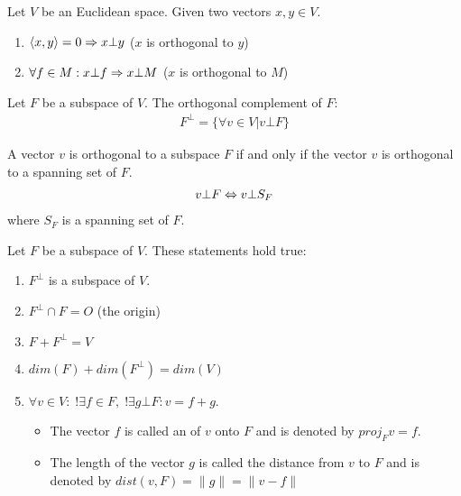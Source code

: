     \par Let $V$ be an Euclidean space. Given two vectors $x, y \in V$.
      \begin{enumerate}
        \item $\langle x, y \rangle = 0 \Rightarrow x \bot y$ ($x$ is orthogonal to $y$)
        \item $\forall f \in M: x \bot f \Rightarrow x \bot M$
          ($x$ is orthogonal to $M$)
      \end{enumerate}
    \par Let $F$ be a subspace of $V$. The orthogonal complement of $F$:
      \begin{align*}
        F^{\bot} = \{\forall v \in V | v \bot F\}
      \end{align*}
      \par A vector $v$ is orthogonal to a subspace $F$ if and only if the
        vector $v$ is orthogonal to a spanning set of $F$.
        \begin{align*}
          v \bot F \Leftrightarrow v \bot S_{F}
        \end{align*}
        where $S_{F}$ is a spanning set of $F$.
      \par Let $F$ be a subspace of $V$. These statements hold true:
        \begin{enumerate}
          \item $F^{\bot}$ is a subspace of $V$.
          \item $F^{\bot} \cap F = {O}$ (the origin)
          \item $F + F^{\bot} = V$
          \item $dim(F) + dim(F^{\bot}) = dim(V)$
          \item $\forall v \in V:
                  \; !\exists f \in F, \; !\exists g \bot F: v = f + g$.
            \begin{itemize}
              \item The vector $f$ is called an 
                of $v$ onto $F$ and is denoted by $proj_{F}v = f$.
              \item The length of the vector $g$ is called the distance from $v$
                to $F$ and is denoted by $dist(v, F) = \|g\| = \|v - f\|$
            \end{itemize}
        \end{enumerate}
